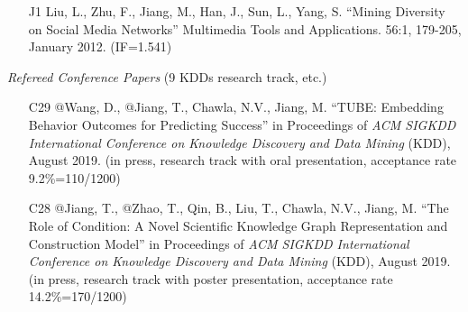 \documentclass[10pt]{article}
\newenvironment{myindentpar}[1]%
{\begin{list}{}%
         {\setlength{\leftmargin}{#1}}%
         \item[]%
}
{\end{list}}
\newcounter{list}
\begin{document}
\begin{myindentpar}{0.00cm}
\begin{enumerate}[leftmargin=.5cm]
\vspace{-0.1cm}
\vspace{0.15cm}

\item[J1] Liu, L., Zhu, F., Jiang, M., Han, J., Sun, L., Yang, S. ``Mining Diversity on Social Media Networks'' Multimedia Tools and Applications. 56:1, 179-205, January 2012. (IF=1.541)

\vspace{-0.1cm}

\end{enumerate}

\hspace{-0.25cm}\emph{Refereed Conference Papers} (9 KDDs research track, etc.)

\begin{enumerate}[leftmargin=.5cm]


\item[C29] @Wang, D., @Jiang, T., Chawla, N.V., Jiang, M. ``TUBE: Embedding Behavior Outcomes for Predicting Success'' in Proceedings of \emph{ACM SIGKDD International Conference on Knowledge Discovery and Data Mining} (KDD), August 2019. (in press, research track with oral presentation, acceptance rate 9.2\%=110/1200)

\vspace{-0.1cm}

\item[C28] @Jiang, T., @Zhao, T., Qin, B., Liu, T., Chawla, N.V., Jiang, M. ``The Role of Condition: A Novel Scientific Knowledge Graph Representation and Construction Model'' in Proceedings of \emph{ACM SIGKDD International Conference on Knowledge Discovery and Data Mining} (KDD), August 2019. (in press, research track with poster presentation, acceptance rate 14.2\%=170/1200)


\end{enumerate}
\end{myindentpar}
\end{document}
